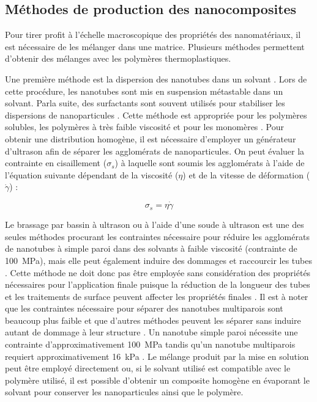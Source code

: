 \subsection{Méthodes de production des nanocomposites}

Pour tirer profit à l'échelle macroscopique des propriétés des nanomatériaux, il est nécessaire de les mélanger dans une matrice. 
Plusieurs méthodes permettent d'obtenir des mélanges avec les polymères thermoplastiques. 

Une première méthode est la dispersion des nanotubes dans un solvant \cite{Mohammad2006}.
Lors de cette procédure, les nanotubes sont mis en suspension métastable dans un solvant. 
Parla suite, des surfactants sont souvent utilisés pour stabiliser les dispersions de nanoparticules \cite{Huang2012}. 
Cette méthode est appropriée pour les polymères solubles, les polymères à très faible viscosité et pour les monomères \cite{Ma2010}. 
Pour obtenir une distribution homogène, il est nécessaire d'employer un générateur d'ultrason afin de séparer les agglomérats de nanoparticules. 
On peut évaluer la contrainte en cisaillement ($\sigma_s$) à laquelle sont soumis les agglomérats à l'aide de l'équation suivante dépendant de la viscosité ($\eta$) et de la vitesse de déformation ($\dot{\gamma}$) : 

\begin{equation}
\sigma_s = \eta \dot{\gamma}
\end{equation}

Le brassage par bassin à ultrason ou à l'aide d'une soude à ultrason est une des seules méthodes procurant les contraintes nécessaire pour réduire les agglomérats de nanotubes à simple paroi dans des solvants à faible viscosité (contrainte de \SI[locale=FR]{100}{\mega\pascal}), mais elle peut également induire des dommages et raccourcir les tubes \cite{Huang2012}. 
Cette méthode ne doit donc pas être employée sans considération des propriétés nécessaires pour l'application finale puisque la réduction de la longueur des tubes et les traitements de surface peuvent affecter les propriétés finales \cite{Grossiord2008a, Diez-Pascual2010, Ma2008}.  
Il est à noter que les contraintes nécessaire pour séparer des nanotubes multiparois sont beaucoup plus faible et que d'autres méthodes peuvent les séparer sans induire autant de dommage à leur structure \cite{Huang2012, Ma2010}. 
Un nanotube simple paroi nécessite une contrainte d'approximativement \SI[locale=FR]{100}{\mega\pascal} tandis qu'un nanotube multiparois requiert approximativement \SI[locale=FR]{16}{\kilo\pascal} \cite{Huang2012}. 
Le mélange produit par la mise en solution peut être employé directement ou, si le solvant utilisé est compatible avec le polymère utilisé, il est possible d'obtenir un composite homogène en évaporant le solvant pour conserver les nanoparticules ainsi que le polymère. 


